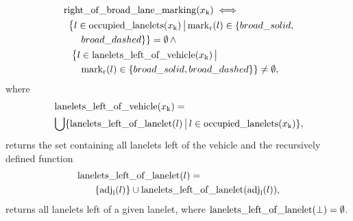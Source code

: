 \begin{align*}
\begin{split}
&  \operatorname*{right\_of\_broad\_lane\_marking}(x_\text{k}) \iff \\ 
& ~~ \big\{l \in \operatorname*{occupied\_lanelets}(x_\text{k}) \, \big| \, \mathrm{mark}_\mathrm{r}(l) \in \{broad\_solid,  \\
& \qquad broad\_dashed\}\} = \emptyset \, \land\\
& \quad \big\{l \in \operatorname*{lanelets\_left\_of\_vehicle}(x_\text{k}) \, \big| \, \\ 
& \qquad \mathrm{mark}_\mathrm{r}(l) \in \{broad\_solid, broad\_dashed\}\} \neq \emptyset, \\
\end{split}
\end{align*}
where
\begin{align*}
\begin{split}
& \allLaneletsLeftOfStateFunction(\kState) = \\ 
& \bigcup \{\allLaneletsLeftOfLaneletFunction(l) \, \big| \, l \in \occupiedLaneletsFunction(\kState)\}, %
\end{split}
\end{align*}
returns the set containing all lanelets left of the vehicle and the recursively defined function
\begin{align*}
\begin{split}
& \operatorname*{lanelets\_left\_of\_lanelet}(l) = \\ 
& \qquad \{\mathrm{adj}_\mathrm{l}(l)\} \cup \operatorname*{lanelets\_left\_of\_lanelet}(\mathrm{adj}_\mathrm{l}(l)), \\
\end{split}
\end{align*}
returns all lanelets left of a given lanelet, where $\operatorname*{lanelets\_left\_of\_lanelet}(\bot) = \emptyset$.
